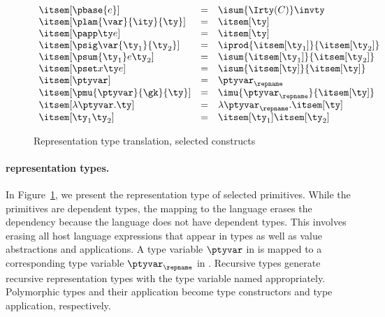\begin{figure}
\fbox{$\itsem[\ty] = \ity$}
\[
\begin{array}{lcl} 
\itsem[\pbase{e}] & = & \isum {\Irty(C)} \invty   \\
\itsem[\plam{\var}{\ity}{\ty}] & = & \itsem[\ty] \\
\itsem[\papp \ty e] & = & \itsem[\ty] \\
\itsem[\psig \var {\ty_1} {\ty_2}]  & = & \iprod {\itsem[\ty_1]} {\itsem[\ty_2]}    \\
\itsem[\psum {\ty_1} e {\ty_2}]     & = & \isum {\itsem[\ty_1]} {\itsem[\ty_2]} \\
\itsem[\pset x \ty e] & = & \isum {\itsem[\ty]}{\itsem[\ty]}\\
\itsem[\ptyvar] & = & \ptyvar_\repname \\
\itsem[\pmu{\ptyvar}{\gk}{\ty}] & = & \imu{\ptyvar_\repname}{\itsem[\ty]} \\
\itsem[\lambda \ptyvar.\ty]       & = & \lambda \ptyvar_\repname.\itsem[\ty] \\
\itsem[\ty_1 \ty_2]              & = & \itsem[\ty_1] \itsem[\ty_2] \\
\end{array}
\]
\caption{Representation type translation, selected constructs}
\label{fig:rep-tys}
\end{figure}


\paragraph*{\ddc{} representation types.}
\label{sec:intty-sem}
In Figure~\ref{fig:rep-tys}, we present the representation type
of selected \ddc{} primitives. While the primitives are
dependent types, the mapping to the \implang{} language 
erases the dependency because the \implang{} language 
does not have dependent types. This involves erasing all host language
expressions that appear in types as well as 
value abstractions and applications.
A type variable $\ptyvar$ in \ddc{} is mapped to a corresponding
type variable $\ptyvar_\repname$ in \fomega{}.
Recursive types generate recursive representation types with the type
variable named appropriately. Polymorphic types and their application 
become \fomega{} type constructors and type application, respectively.

